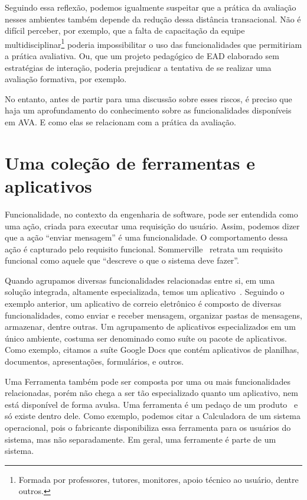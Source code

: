Seguindo essa reflexão, podemos igualmente suspeitar que a prática da avaliação nesses ambientes também depende da redução dessa distância transacional. Não é difícil perceber, por exemplo, que a falta de capacitação da equipe multidisciplinar\footnote{Formada por professores, tutores, monitores, apoio técnico ao usuário, dentre outros.} poderia impossibilitar o uso das funcionalidades que permitiriam a prática avaliativa. Ou, que um projeto pedagógico de EAD elaborado sem estratégias de interação, poderia prejudicar a tentativa de se realizar uma avaliação formativa, por exemplo.

No entanto, antes de partir para uma discussão sobre esses riscos, é preciso que haja um aprofundamento do conhecimento sobre as funcionalidades disponíveis em AVA. E como elas se relacionam com a prática da avaliação.


\section{Uma coleção de ferramentas e aplicativos}%

Funcionalidade, no contexto da engenharia de software, pode ser entendida como uma ação, criada para executar uma requisição do usuário. Assim, podemos dizer que a ação ``enviar mensagem'' é uma funcionalidade. O comportamento dessa ação é capturado pelo requisito funcional. Sommerville~\cite{sommerville2011eng} retrata um requisito funcional como aquele que ``descreve o que o sistema deve fazer''. 

Quando agrupamos diversas funcionalidades relacionadas entre si, em uma solução integrada, altamente especializada, temos um aplicativo~\cite{martins@tecnicas}. Seguindo o exemplo anterior, um aplicativo de correio eletrônico é composto de diversas funcionalidades, como enviar e receber mensagem, organizar pastas de mensagens, armazenar, dentre outras. Um agrupamento de aplicativos especializados em um único ambiente, costuma ser denominado como suíte ou pacote de aplicativos. Como exemplo, citamos a suíte Google Docs que contém aplicativos de planilhas, documentos, apresentações, formulários, e outros.

Uma Ferramenta também pode ser composta por uma ou mais funcionalidades relacionadas, porém não chega a ser tão especializado quanto um aplicativo, nem está disponível de forma avulsa. Uma ferramenta é um pedaço de um produto~\cite{martins@tecnicas} e só existe dentro dele. Como exemplo, podemos citar a Calculadora de um sistema operacional, pois o fabricante disponibiliza essa ferramenta para os usuários do sistema, mas não separadamente. Em geral, uma ferramente é parte de um sistema.

